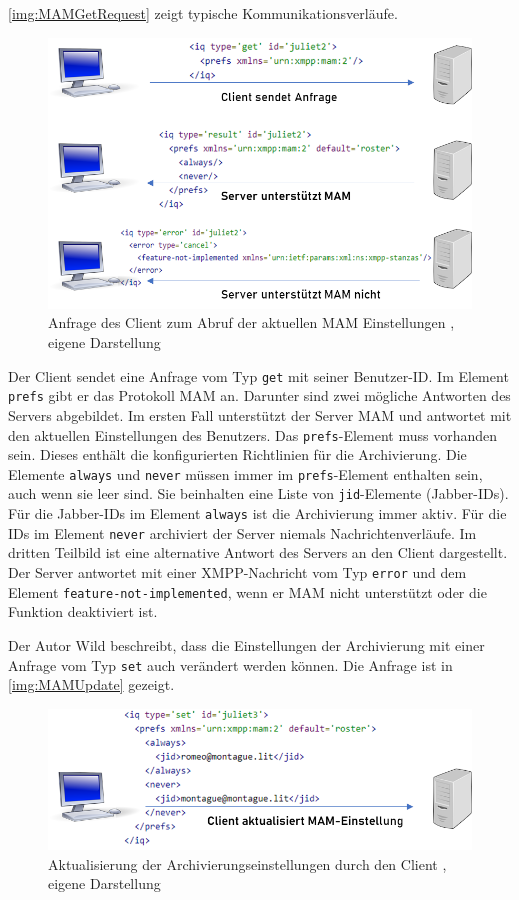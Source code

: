 \documentclass[a4paper,titlepage,halfparskip,12pt]{scrreprt}
\begin{document}
\begin{onehalfspacing}
\autoref{img:MAMGetRequest} zeigt typische Kommunikationsverläufe.

\begin{figure}[h]
\centering
\includegraphics[width=.7\linewidth]{images/XEP0313_GetRequest}
\caption{Anfrage des Client zum Abruf der aktuellen \ac{MAM} Einstellungen \cite{xepMAM}, eigene Darstellung}
\label{img:MAMGetRequest}
\end{figure}

Der Client sendet eine Anfrage vom Typ \texttt{get} mit seiner Benutzer-ID. Im Element \texttt{prefs} gibt er das Protokoll \ac{MAM} an. Darunter sind zwei mögliche Antworten des Servers abgebildet. Im ersten Fall unterstützt der Server \ac{MAM} und antwortet mit den aktuellen Einstellungen des Benutzers. Das \texttt{prefs}-Element muss vorhanden sein. Dieses enthält die konfigurierten Richtlinien für die Archivierung. Die Elemente \texttt{always} und \texttt{never} müssen immer im \texttt{prefs}-Element enthalten sein, auch wenn sie leer sind. Sie beinhalten eine Liste von \texttt{jid}-Elemente (Jabber-IDs). Für die Jabber-IDs im Element \texttt{always} ist die Archivierung immer aktiv. Für die IDs im Element \texttt{never} archiviert der Server niemals Nachrichtenverläufe. Im dritten Teilbild ist eine alternative Antwort des Servers an den Client dargestellt. Der Server antwortet mit einer \ac{XMPP}-Nachricht vom Typ \texttt{error} und dem Element \texttt{feature-not-implemented}, wenn er \ac{MAM} nicht unterstützt oder die Funktion deaktiviert ist.\cite{xepMAM}

Der Autor Wild \cite{xepMAM} beschreibt, dass die Einstellungen der Archivierung mit einer Anfrage vom Typ \texttt{set} auch verändert werden können. Die Anfrage ist in \autoref{img:MAMUpdate} gezeigt.

\begin{figure}[h]
\centering
\includegraphics[width=.8\linewidth]{images/XEP0313_UpdateRequest}
\caption{Aktualisierung der Archivierungseinstellungen durch den Client \cite{xepMAM}, eigene Darstellung}
\label{img:MAMUpdate}
\end{figure}


\end{onehalfspacing}
\end{document}
